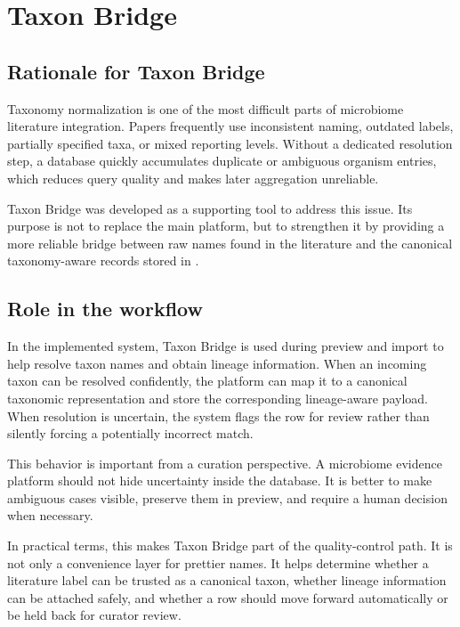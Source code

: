 \section{Taxon Bridge}

\subsection{Rationale for Taxon Bridge}

Taxonomy normalization is one of the most difficult parts of microbiome literature integration. Papers frequently use inconsistent naming, outdated labels, partially specified taxa, or mixed reporting levels. Without a dedicated resolution step, a database quickly accumulates duplicate or ambiguous organism entries, which reduces query quality and makes later aggregation unreliable.

Taxon Bridge was developed as a supporting tool to address this issue. Its purpose is not to replace the main platform, but to strengthen it by providing a more reliable bridge between raw names found in the literature and the canonical taxonomy-aware records stored in \projectname{}.

\subsection{Role in the workflow}

In the implemented system, Taxon Bridge is used during preview and import to help resolve taxon names and obtain lineage information. When an incoming taxon can be resolved confidently, the platform can map it to a canonical taxonomic representation and store the corresponding lineage-aware payload. When resolution is uncertain, the system flags the row for review rather than silently forcing a potentially incorrect match.

This behavior is important from a curation perspective. A microbiome evidence platform should not hide uncertainty inside the database. It is better to make ambiguous cases visible, preserve them in preview, and require a human decision when necessary.

In practical terms, this makes Taxon Bridge part of the quality-control path. It is not only a convenience layer for prettier names. It helps determine whether a literature label can be trusted as a canonical taxon, whether lineage information can be attached safely, and whether a row should move forward automatically or be held back for curator review.

